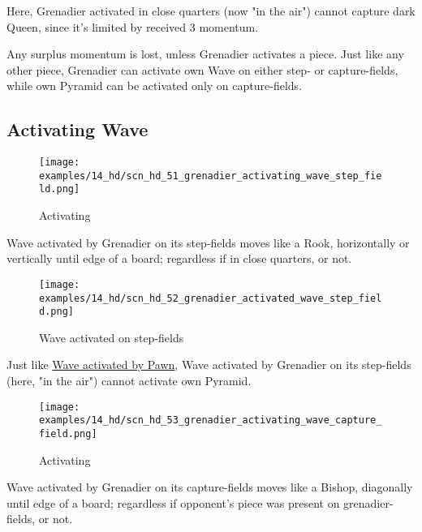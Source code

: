 \vspace*{-0.5\baselineskip}
Here, Grenadier activated in close quarters (now "in the air") cannot capture dark
Queen, since it's limited by received 3 momentum.

Any surplus momentum is lost, unless Grenadier activates a piece. Just like any other
piece, Grenadier can activate own Wave on either step- or capture-fields, while own
Pyramid can be activated only on capture-fields.

\clearpage %

\subsection*{Activating Wave}
\label{sec:Hemera's Dawn/Grenadier/Activating Wave}

\vspace*{-1.1\baselineskip}
\noindent
\begin{wrapfigure}[5]{l}{0.4\textwidth}
\centering
\texttt{[image: examples/14\_hd/scn\_hd\_51\_grenadier\_activating\_wave\_step\_field.png]}
\vspace*{-0.5\baselineskip}
\caption{Activating}
\label{fig:scn_hd_51_grenadier_activating_wave_step_field}
\end{wrapfigure}
Wave activated by Grenadier on its step-fields moves like a Rook, horizontally or
vertically until edge of a board; regardless if in close quarters, or not.

\vspace*{-1.1\baselineskip}
\noindent
\begin{figure}[!h]
\texttt{[image: examples/14\_hd/scn\_hd\_52\_grenadier\_activated\_wave\_step\_field.png]}
\vspace*{-1.4\baselineskip}
\caption{Wave activated on step-fields}
\label{fig:scn_hd_52_grenadier_activated_wave_step_field}
\end{figure}

\vspace*{-0.5\baselineskip}
Just like
\hyperref[fig:scn_n_17_sideways_pawn_does_not_activate_pyramid]{Wave activated by Pawn},
Wave activated by Grenadier on its step-fields (here, "in the air") cannot activate own
Pyramid.

\clearpage %

\vspace*{-2.1\baselineskip}
\noindent
\begin{wrapfigure}[5]{l}{0.4\textwidth}
\centering
\texttt{[image: examples/14\_hd/scn\_hd\_53\_grenadier\_activating\_wave\_capture\_field.png]}
\vspace*{-0.5\baselineskip}
\caption{Activating}
\label{fig:scn_hd_53_grenadier_activating_wave_capture_field}
\end{wrapfigure}
Wave activated by Grenadier on its capture-fields moves like a Bishop, diagonally until
edge of a board; regardless if opponent's piece was present on grenadier-fields, or not.

